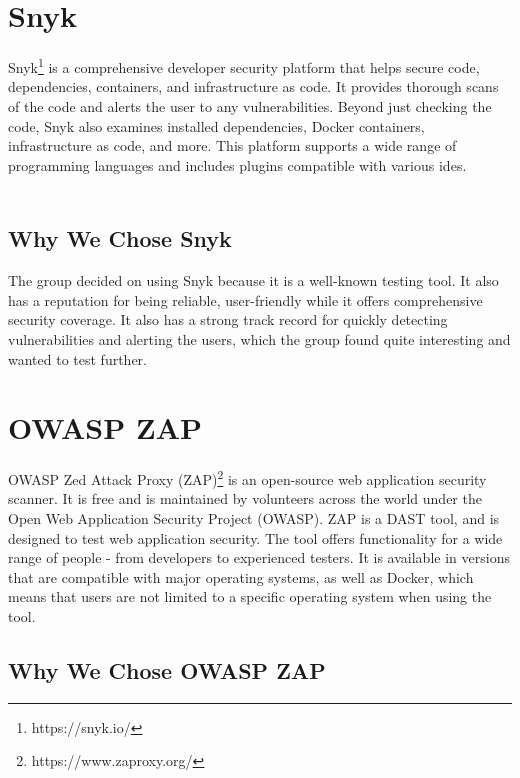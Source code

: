 \section{Snyk}
Snyk\footnote{https://snyk.io/} is a comprehensive developer security platform that helps secure code, dependencies, containers, and infrastructure as code. It provides thorough scans of the code and alerts the user to any vulnerabilities. Beyond just checking the code, Snyk also examines installed dependencies, Docker containers, infrastructure as code, and more. This platform supports a wide range of programming languages and includes plugins compatible with various \acrlong{ide}s.\cite{snyk1}
\\~\\
\subsection{Why We Chose Snyk}
The group decided on using Snyk because it is a well-known testing tool. It also has a reputation for being reliable, user-friendly while it offers comprehensive security coverage. It also has a strong track record for quickly detecting vulnerabilities and alerting the users, which the group found quite interesting and wanted to test further. \cite{snyk3}
\section{OWASP ZAP}
OWASP Zed Attack Proxy (ZAP)\footnote{https://www.zaproxy.org/} is an open-source web application security scanner. It is free and is maintained by volunteers across the world under the Open Web Application Security Project (OWASP). ZAP is a DAST tool, and is designed to test web application security. The tool offers functionality for a wide range of people - from developers to experienced testers. It is available in versions that are compatible with major operating systems, as well as Docker, which means that users are not limited to a specific operating system when using the tool.\cite{owaspZAP}

\subsection{Why We Chose OWASP ZAP}

